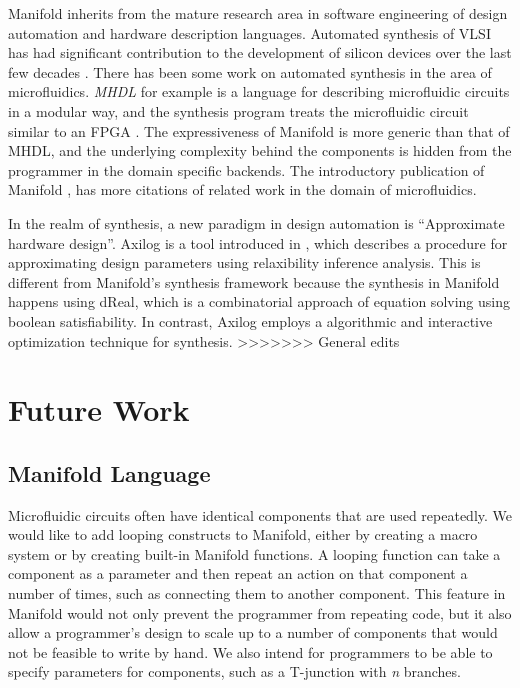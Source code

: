 Manifold inherits from the mature research area in software engineering of
design automation and hardware description languages. Automated synthesis of VLSI has had
significant contribution to the development of silicon devices over the last few decades
\cite{MeadConway80}. There has been some work on automated synthesis in the area of microfluidics.
\emph{MHDL} for example is a language for describing microfluidic circuits in a modular way, and the
synthesis program treats the microfluidic circuit similar to an FPGA \cite{McDaniel13aspdac}. The
expressiveness of Manifold is more generic than that of MHDL, and the underlying complexity behind
the components is hidden from the programmer in the domain specific backends. The introductory
publication of Manifold \cite{Berzish16cascon}, has more citations of related work in the domain of
microfluidics.

In the realm of synthesis, a new paradigm in design automation is ``Approximate hardware design''.
Axilog is a tool introduced in \cite{axilog}, which describes a procedure for approximating design
parameters using relaxibility inference analysis. This is different from Manifold's synthesis
framework because the synthesis in Manifold happens using dReal, which is a combinatorial approach
of equation solving using boolean satisfiability. In contrast, Axilog employs a algorithmic and
interactive optimization technique for synthesis.
>>>>>>> General edits

\section{Future Work}

\subsection{Manifold Language}

Microfluidic circuits often have identical components that are used repeatedly.
We would like to add looping constructs to Manifold, either by creating a
macro system or by creating built-in Manifold functions. A looping function
can take a component as a parameter and then repeat an action on that
component a number of times, such as connecting them to another component.
This feature in Manifold would not only prevent the programmer from repeating
code, but it also allow a programmer's design to scale up to a number of
components that would not be feasible to write by hand. We also intend for
programmers to be able to specify parameters for components, such as a T-junction with \emph{n} branches.

